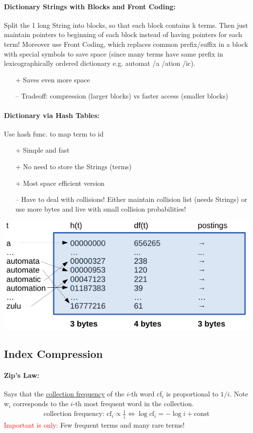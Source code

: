 \documentclass[a4paper,11pt]{article}
\begin{document}
\begin{multicols}{2}
\paragraph{Dictionary Strings with Blocks and Front Coding:} Split the 1 long String into blocks, so that each block contains k terms. Then just maintain pointers to beginning of each block instead of having pointers for each term! Moreover use Front Coding, which replaces common prefix/suffix in a block with special symbols to save space (since many terms have same prefix in lexicographically ordered dictionary e.g. automat /a /ation /ic).
\begin{itemize}
  \item[+] Saves even more space
  \item[--] Tradeoff: compression (larger blocks) vs faster access (smaller blocks)
\end{itemize}

\paragraph{Dictionary via Hash Tables:} Use hash func. to map term to id
\begin{itemize}
  \item[+] Simple and fast
  \item[+] No need to store the Strings (terms)
  \item[+] Most space efficient version
  \item[--] Have to deal with collisions! Either maintain collision list (needs Strings) or use more bytes and live with small collision probabilities!
\end{itemize}
\begin{center}
  \includegraphics[width=0.7\columnwidth]{dictionary-hash.png}
\end{center}

\subsection{Index Compression}
\paragraph{Zip's Law:} Says that the \underline{collection frequency} of the $i$-th word cf$_i$ is proportional to $1/i$. Note w$_i$ corresponds to the $i$-th most frequent word in the collection.
\begin{align*}
  \text{collection frequency: } \text{cf}_i \propto \frac{1}{i} \Leftrightarrow \log \text{cf}_i = - \log i + \text{const}
\end{align*}
\textcolor{red}{Important is only:} Few frequent terms and many rare terms!


\end{multicols}
\end{document}
